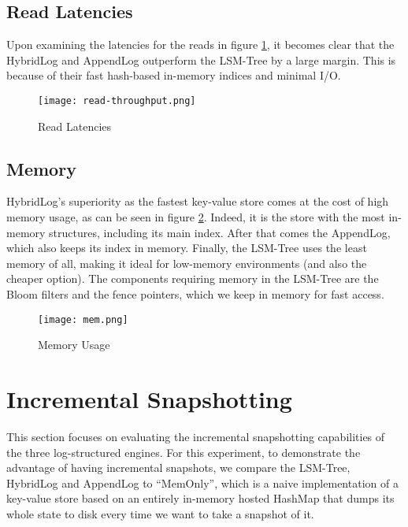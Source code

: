 \subsection{Read Latencies}

Upon examining the latencies for the reads in figure \ref{fig:comparison-read-latencies}, it becomes clear that the HybridLog and AppendLog outperform the LSM-Tree by a large margin. This is because of their fast hash-based in-memory indices and minimal I/O.

\begin{figure}[H]
    \centering
    \texttt{[image: read-throughput.png]}
    \caption{Read Latencies}
    \label{fig:comparison-read-latencies}
\end{figure}

\subsection{Memory}

HybridLog's superiority as the fastest key-value store comes at the cost of high memory usage, as can be seen in figure \ref{fig:comparison-memory}. Indeed, it is the store with the most in-memory structures, including its main index. After that comes the AppendLog, which also keeps its index in memory. Finally, the LSM-Tree uses the least memory of all, making it ideal for low-memory environments (and also the cheaper option). The components requiring memory in the LSM-Tree are the Bloom filters and the fence pointers, which we keep in memory for fast access.

\begin{figure}[H]
    \centering
    \texttt{[image: mem.png]}
    \caption{Memory Usage}
    \label{fig:comparison-memory}
\end{figure}

\section{Incremental Snapshotting}

This section focuses on evaluating the incremental snapshotting capabilities of the three log-structured engines. For this experiment, to demonstrate the advantage of having incremental snapshots, we compare the LSM-Tree, HybridLog and AppendLog to ``MemOnly'', which is a naive implementation of a key-value store based on an entirely in-memory hosted HashMap that dumps its whole state to disk every time we want to take a snapshot of it.


